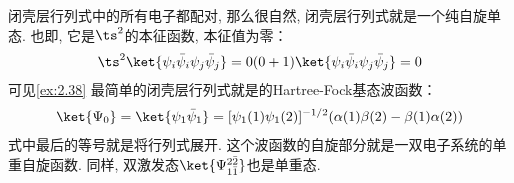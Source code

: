 闭壳层行列式中的所有电子都配对, 
那么很自然, 
闭壳层行列式就是一个纯自旋单态. 
也即, 
它是$\ts^2$的本征函数, 
本征值为零：
\begin{align}\label{eq:2.256}
\ts^2\ket{\psi_i\bar{\psi}_i\psi_j\bar{\psi}_j} = 0(0+1)\ket{\psi_i\bar{\psi}_i\psi_j\bar{\psi}_j} = 0
\end{align}
可见\autoref{ex:2.38} 
最简单的闭壳层行列式就是的Hartree-Fock基态波函数：
\begin{align}\label{eq:2.257}
\ket{\Psi_0} = \ket{\psi_1\bar{\psi}_1} = [\psi_1(1)\psi_1(2)]^{-1/2}(\alpha(1)\beta(2) - \beta(1)\alpha(2))
\end{align}
式中最后的等号就是将行列式展开. 
这个波函数的自旋部分就是一双电子系统的单重自旋函数. 
同样, 
双激发态$\ket{\Psi_{1\bar{1}}^{2\bar{2}}}$也是单重态.


